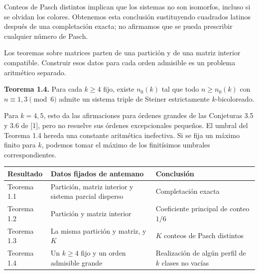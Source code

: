 \documentclass[spanish,11pt,a4paper]{article}
\begin{document}
Conteos de Pasch distintos implican que los sistemas no son isomorfos, incluso si se olvidan los colores. Obtenemos esta conclusión sustituyendo cuadrados latinos después de una completación exacta; no afirmamos que se pueda prescribir cualquier número de Pasch.

Los teoremas sobre matrices parten de una partición y de una matriz interior compatible. Construir esos datos para cada orden admisible es un problema aritmético separado.

\textbf{Teorema 1.4.} Para cada \(k\ge4\) fijo, existe \(n_0(k)\) tal que todo \(n\ge n_0(k)\) con \(n\equiv1,3\pmod6\) admite un sistema triple de Steiner estrictamente \(k\)-bicoloreado.

Para \(k=4,5\), esto da las afirmaciones para órdenes grandes de las Conjeturas 3.5 y 3.6 de {[}1{]}, pero no resuelve sus órdenes excepcionales pequeños. El umbral del Teorema 1.4 hereda una constante aritmética inefectiva. Si se fija un máximo finito para \(k\), podemos tomar el máximo de los finitísimos umbrales correspondientes.

{\begin{longtable}[]{@{}
  >{\raggedright\arraybackslash}p{}
  >{\raggedright\arraybackslash}p{}
  >{\raggedright\arraybackslash}p{}@{}}
\toprule\noalign{}
\begin{minipage}[b]{\linewidth}\raggedright
Resultado
\end{minipage} & \begin{minipage}[b]{\linewidth}\raggedright
Datos fijados de antemano
\end{minipage} & \begin{minipage}[b]{\linewidth}\raggedright
Conclusión
\end{minipage} \\
\midrule\noalign{}
\endhead
\bottomrule\noalign{}
\endlastfoot
Teorema 1.1 & Partición, matriz interior y sistema parcial disperso & Completación exacta \\
Teorema 1.2 & Partición y matriz interior & Coeficiente principal de conteo \(1/6\) \\
Teorema 1.3 & La misma partición y matriz, y \(K\) & \(K\) conteos de Pasch distintos \\
Teorema 1.4 & Un \(k\ge4\) fijo y un orden admisible grande & Realización de algún perfil de \(k\) clases no vacías \\
\end{longtable}
}
\end{document}
